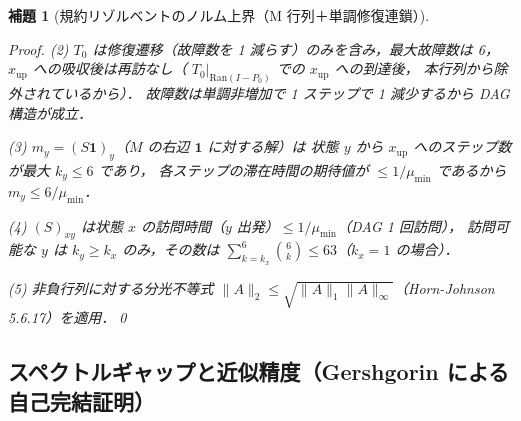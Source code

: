 \documentclass[12pt,a4paper]{article}
\theoremstyle{plain}
\newtheorem{lemma}[theorem]{補題}
\theoremstyle{definition}
\theoremstyle{remark}
\newcommand{\RedRes}{S}
\begin{document}
\begin{lemma}[規約リゾルベントのノルム上界（M 行列＋単調修復連鎖）]
\begin{proof}
    (2) $T_0$ は修復遷移（故障数を 1 減らす）のみを含み，最大故障数は 6，
    $x_{\mathrm{up}}$ への吸収後は再訪なし（ $T_0|_{\mathrm{Ran}(I-P_0)}$ での $x_{\mathrm{up}}$ への到達後，
    本行列から除外されているから）．
    故障数は単調非増加で 1 ステップで 1 減少するから DAG 構造が成立．

    (3) $m_y=(\RedRes\mathbf{1})_y$（$M$ の右辺 $\mathbf{1}$ に対する解）は
    状態 $y$ から $x_{\mathrm{up}}$ へのステップ数が最大 $k_y\le6$ であり，
    各ステップの滞在時間の期待値が $\le1/\mu_{\min}$ であるから $m_y\le6/\mu_{\min}$．

    (4) $(\RedRes)_{xy}$ は状態 $x$ の訪問時間（$y$ 出発）$\le1/\mu_{\min}$（DAG 1 回訪問），
    訪問可能な $y$ は $k_y\ge k_x$ のみ，その数は $\sum_{k=k_x}^{6}\binom{6}{k}\le63$（$k_x=1$ の場合）．

    (5) 非負行列に対する分光不等式
    $\|A\|_2\le\sqrt{\|A\|_1\|A\|_\infty}$（Horn-Johnson \cite{horn2013} 5.6.17）を適用．\qed
  \end{proof}
\end{lemma}

\subsection{スペクトルギャップと近似精度（Gershgorin による自己完結証明）}
\end{document}
